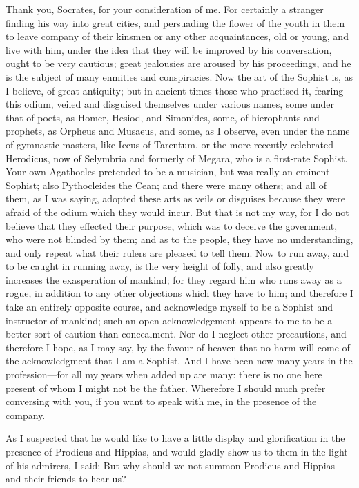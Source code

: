 \documentclass[11pt,letter]{article}
\begin{document}
\par  Thank you, Socrates, for your consideration of me. For certainly a stranger finding his way into great cities, and persuading the flower of the youth in them to leave company of their kinsmen or any other acquaintances, old or young, and live with him, under the idea that they will be improved by his conversation, ought to be very cautious; great jealousies are aroused by his proceedings, and he is the subject of many enmities and conspiracies. Now the art of the Sophist is, as I believe, of great antiquity; but in ancient times those who practised it, fearing this odium, veiled and disguised themselves under various names, some under that of poets, as Homer, Hesiod, and Simonides, some, of hierophants and prophets, as Orpheus and Musaeus, and some, as I observe, even under the name of gymnastic-masters, like Iccus of Tarentum, or the more recently celebrated Herodicus, now of Selymbria and formerly of Megara, who is a first-rate Sophist. Your own Agathocles pretended to be a musician, but was really an eminent Sophist; also Pythocleides the Cean; and there were many others; and all of them, as I was saying, adopted these arts as veils or disguises because they were afraid of the odium which they would incur. But that is not my way, for I do not believe that they effected their purpose, which was to deceive the government, who were not blinded by them; and as to the people, they have no understanding, and only repeat what their rulers are pleased to tell them. Now to run away, and to be caught in running away, is the very height of folly, and also greatly increases the exasperation of mankind; for they regard him who runs away as a rogue, in addition to any other objections which they have to him; and therefore I take an entirely opposite course, and acknowledge myself to be a Sophist and instructor of mankind; such an open acknowledgement appears to me to be a better sort of caution than concealment. Nor do I neglect other precautions, and therefore I hope, as I may say, by the favour of heaven that no harm will come of the acknowledgment that I am a Sophist. And I have been now many years in the profession—for all my years when added up are many: there is no one here present of whom I might not be the father. Wherefore I should much prefer conversing with you, if you want to speak with me, in the presence of the company.

\par  As I suspected that he would like to have a little display and glorification in the presence of Prodicus and Hippias, and would gladly show us to them in the light of his admirers, I said: But why should we not summon Prodicus and Hippias and their friends to hear us?
\end{document}
